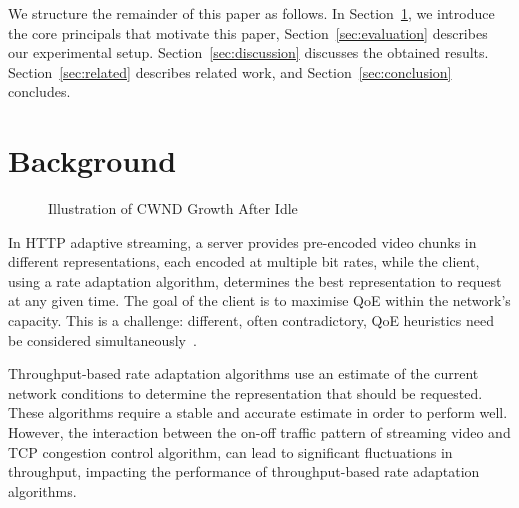 \documentclass[10pt,sigconf,anonymous]{acmart}
\begin{document}
We structure the remainder of this paper as follows. In Section~\ref{sec:background}, we introduce the core principals that motivate this paper, Section~\ref{sec:evaluation} describes our experimental setup. Section~\ref{sec:discussion} discusses the obtained results. Section~\ref{sec:related} describes related work, and Section~\ref{sec:conclusion} concludes.

\section{Background}
\label{sec:background}

\begin{figure}
  \centering

    \caption{Illustration of CWND Growth After Idle}
    \label{fig:cwnd-growth-after-idle}
\end{figure}


In HTTP adaptive streaming, a server provides pre-encoded video chunks in different representations, each encoded at multiple bit rates, while the client, using a rate adaptation algorithm, determines the best representation to request at any given time. The goal of the client is to maximise QoE within the network's capacity. This is a challenge: different, often contradictory, QoE heuristics need be considered simultaneously~\cite{Seufert-2015-A-Survey-on-QoE-Dash}. 

Throughput-based rate adaptation algorithms use an estimate of the current network conditions to determine the representation that should be requested. These algorithms require a stable and accurate estimate in order to perform well. However, the interaction between the on-off traffic pattern of streaming video and TCP congestion control algorithm, can lead to significant fluctuations in throughput, impacting the performance of throughput-based rate adaptation algorithms.
\end{document}

